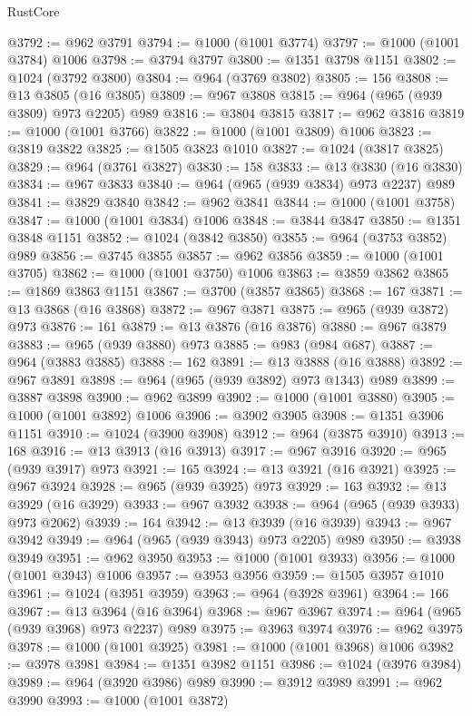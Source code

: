 \begin{lexlean}{RustCore}
\begin{coremodule}
@3792 := @962 @3791
@3794 := @1000 (@1001 @3774)
@3797 := @1000 (@1001 @3784) @1006
@3798 := @3794 @3797
@3800 := @1351 @3798 @1151
@3802 := @1024 (@3792 @3800)
@3804 := @964 (@3769 @3802)
@3805 := 156
@3808 := @13 @3805 (@16 @3805)
@3809 := @967 @3808
@3815 := @964 (@965 (@939 @3809) @973 @2205) @989
@3816 := @3804 @3815
@3817 := @962 @3816
@3819 := @1000 (@1001 @3766)
@3822 := @1000 (@1001 @3809) @1006
@3823 := @3819 @3822
@3825 := @1505 @3823 @1010
@3827 := @1024 (@3817 @3825)
@3829 := @964 (@3761 @3827)
@3830 := 158
@3833 := @13 @3830 (@16 @3830)
@3834 := @967 @3833
@3840 := @964 (@965 (@939 @3834) @973 @2237) @989
@3841 := @3829 @3840
@3842 := @962 @3841
@3844 := @1000 (@1001 @3758)
@3847 := @1000 (@1001 @3834) @1006
@3848 := @3844 @3847
@3850 := @1351 @3848 @1151
@3852 := @1024 (@3842 @3850)
@3855 := @964 (@3753 @3852) @989
@3856 := @3745 @3855
@3857 := @962 @3856
@3859 := @1000 (@1001 @3705)
@3862 := @1000 (@1001 @3750) @1006
@3863 := @3859 @3862
@3865 := @1869 @3863 @1151
@3867 := @3700 (@3857 @3865)
@3868 := 167
@3871 := @13 @3868 (@16 @3868)
@3872 := @967 @3871
@3875 := @965 (@939 @3872) @973
@3876 := 161
@3879 := @13 @3876 (@16 @3876)
@3880 := @967 @3879
@3883 := @965 (@939 @3880) @973
@3885 := @983 (@984 @687)
@3887 := @964 (@3883 @3885)
@3888 := 162
@3891 := @13 @3888 (@16 @3888)
@3892 := @967 @3891
@3898 := @964 (@965 (@939 @3892) @973 @1343) @989
@3899 := @3887 @3898
@3900 := @962 @3899
@3902 := @1000 (@1001 @3880)
@3905 := @1000 (@1001 @3892) @1006
@3906 := @3902 @3905
@3908 := @1351 @3906 @1151
@3910 := @1024 (@3900 @3908)
@3912 := @964 (@3875 @3910)
@3913 := 168
@3916 := @13 @3913 (@16 @3913)
@3917 := @967 @3916
@3920 := @965 (@939 @3917) @973
@3921 := 165
@3924 := @13 @3921 (@16 @3921)
@3925 := @967 @3924
@3928 := @965 (@939 @3925) @973
@3929 := 163
@3932 := @13 @3929 (@16 @3929)
@3933 := @967 @3932
@3938 := @964 (@965 (@939 @3933) @973 @2062)
@3939 := 164
@3942 := @13 @3939 (@16 @3939)
@3943 := @967 @3942
@3949 := @964 (@965 (@939 @3943) @973 @2205) @989
@3950 := @3938 @3949
@3951 := @962 @3950
@3953 := @1000 (@1001 @3933)
@3956 := @1000 (@1001 @3943) @1006
@3957 := @3953 @3956
@3959 := @1505 @3957 @1010
@3961 := @1024 (@3951 @3959)
@3963 := @964 (@3928 @3961)
@3964 := 166
@3967 := @13 @3964 (@16 @3964)
@3968 := @967 @3967
@3974 := @964 (@965 (@939 @3968) @973 @2237) @989
@3975 := @3963 @3974
@3976 := @962 @3975
@3978 := @1000 (@1001 @3925)
@3981 := @1000 (@1001 @3968) @1006
@3982 := @3978 @3981
@3984 := @1351 @3982 @1151
@3986 := @1024 (@3976 @3984)
@3989 := @964 (@3920 @3986) @989
@3990 := @3912 @3989
@3991 := @962 @3990
@3993 := @1000 (@1001 @3872)

\end{coremodule}
\end{lexlean}
